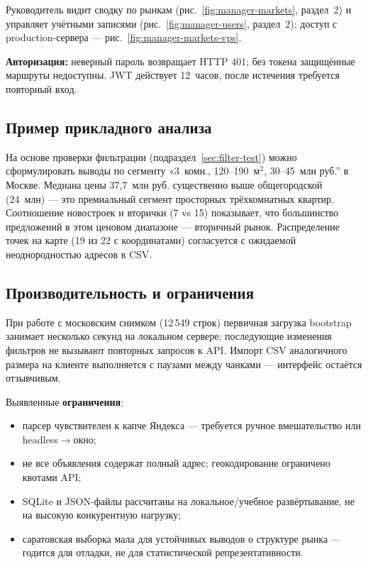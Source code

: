 
Руководитель видит сводку по рынкам (рис.~\ref{fig:manager-markets}, раздел~2) и управляет учётными записями (рис.~\ref{fig:manager-users}, раздел~2); доступ с production-сервера --- рис.~\ref{fig:manager-markets-vps}.

\textbf{Авторизация:} неверный пароль возвращает HTTP 401; без токена защищённые маршруты недоступны. JWT действует 12~часов, после истечения требуется повторный вход.



\subsection{Пример прикладного анализа}

На основе проверки фильтрации (подраздел~\ref{sec:filter-test}) можно сформулировать выводы по сегменту «3~комн., 120--190~м$^2$, 30--45~млн руб.'' в Москве. Медиана цены 37,7~млн руб. существенно выше общегородской (24~млн) --- это премиальный сегмент просторных трёхкомнатных квартир. Соотношение новостроек и вторички (7 vs 15) показывает, что большинство предложений в этом ценовом диапазоне --- вторичный рынок. Распределение точек на карте (19 из 22 с координатами) согласуется с ожидаемой неоднородностью адресов в CSV.

\subsection{Производительность и ограничения}

При работе с московским снимком (12\,549 строк) первичная загрузка bootstrap занимает несколько секунд на локальном сервере; последующие изменения фильтров не вызывают повторных запросов к API. Импорт CSV аналогичного размера на клиенте выполняется с паузами между чанками --- интерфейс остаётся отзывчивым.

Выявленные \textbf{ограничения}:
\begin{itemize}
    \item парсер чувствителен к капче Яндекса --- требуется ручное вмешательство или headless$\rightarrow$окно;
    \item не все объявления содержат полный адрес; геокодирование ограничено квотами API;
    \item SQLite и JSON-файлы рассчитаны на локальное/учебное развёртывание, не на высокую конкурентную нагрузку;
    \item саратовская выборка мала для устойчивых выводов о структуре рынка --- годится для отладки, не для статистической репрезентативности.
\end{itemize}

